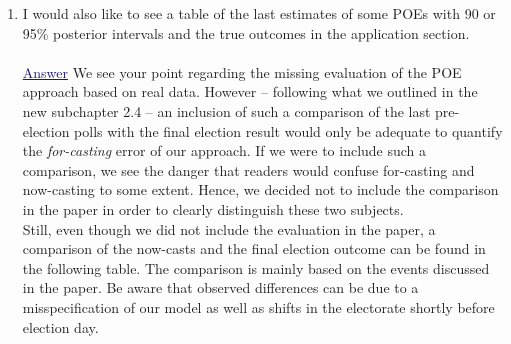 \documentclass{scrartcl}
\newcommand{\blue}[1]{\textcolor{MidnightBlue}{\underline{\textcolor{MidnightBlue}{#1}}}}
\begin{document}
\begin{enumerate}
  \item I would also like to see a table of the last estimates of some POEs with 90 or 95\% posterior intervals and the true outcomes in the application section.
  \\ \\
  \blue{Answer} We see your point regarding the missing evaluation of the POE approach based on real data.
However -- following what we outlined in the new subchapter 2.4 -- an inclusion of such a comparison of the last pre-election polls with the final election result would only be adequate to quantify the \emph{for-casting} error of our approach. If we were to include such a comparison, we see the danger that readers would confuse for-casting and now-casting to some extent. Hence, we decided not to include the comparison in the paper in order to clearly distinguish these two subjects.\\
Still, even though we did not include the evaluation in the paper, a comparison of the now-casts and the final election outcome can be found in the following table. The comparison is mainly based on the events discussed in the paper. Be aware that observed differences can be due to a misspecification of our model as well as shifts in the electorate shortly before election day.
\end{enumerate}
\end{document}
